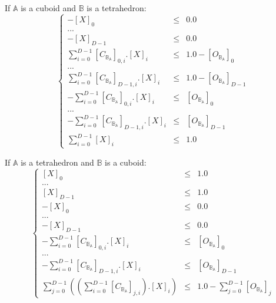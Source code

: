 \documentclass[12pt, a4paper]{article}
\begin{document}
If $\mathbb{A}$ is a cuboid and $\mathbb{B}$ is a tetrahedron:
\begin{equation}
\left\lbrace
\begin{array}{rcl}
-\left[X\right]_0&\le&0.0\\
...\\
-\left[X\right]_{D-1}&\le&0.0\\
\sum_{i=0}^{D-1}\left[C_{\mathbb{B}_\mathbb{A}}\right]_{0,i}.\left[X\right]_i&\le&1.0-\left[O_{\mathbb{B}_\mathbb{A}}\right]_0\\
...\\
\sum_{i=0}^{D-1}\left[C_{\mathbb{B}_\mathbb{A}}\right]_{D-1,i}.\left[X\right]_i&\le&1.0-\left[O_{\mathbb{B}_\mathbb{A}}\right]_{D-1}\\
-\sum_{i=0}^{D-1}\left[C_{\mathbb{B}_\mathbb{A}}\right]_{0,i}.\left[X\right]_i&\le&\left[O_{\mathbb{B}_\mathbb{A}}\right]_0\\
...\\
-\sum_{i=0}^{D-1}\left[C_{\mathbb{B}_\mathbb{A}}\right]_{D-1,i}.\left[X\right]_i&\le&\left[O_{\mathbb{B}_\mathbb{A}}\right]_{D-1}\\
\sum_{i=0}^{D-1}\left[X\right]_i&\le&1.0
\end{array}
\right.
\end{equation}

If $\mathbb{A}$ is a tetrahedron and $\mathbb{B}$ is a cuboid:
\begin{equation}
\left\lbrace
\begin{array}{rcl}
\left[X\right]_0&\le&1.0\\
...\\
\left[X\right]_{D-1}&\le&1.0\\
-\left[X\right]_0&\le&0.0\\
...\\
-\left[X\right]_{D-1}&\le&0.0\\
-\sum_{i=0}^{D-1}\left[C_{\mathbb{B}_\mathbb{A}}\right]_{0,i}.\left[X\right]_i&\le&\left[O_{\mathbb{B}_\mathbb{A}}\right]_0\\
...\\
-\sum_{i=0}^{D-1}\left[C_{\mathbb{B}_\mathbb{A}}\right]_{D-1,i}.\left[X\right]_i&\le&\left[O_{\mathbb{B}_\mathbb{A}}\right]_{D-1}\\
\sum_{j=0}^{D-1}\left(\left(\sum_{i=0}^{D-1}\left[C_{\mathbb{B}_\mathbb{A}}\right]_{j,i}\right).\left[X\right]_i\right)&\le&1.0-\sum_{j=0}^{D-1}\left[O_{\mathbb{B}_\mathbb{A}}\right]_j
\end{array}
\right.
\end{equation}
\end{document}
